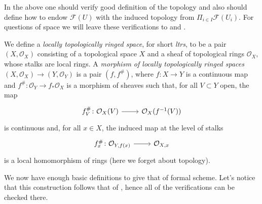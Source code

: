 \begin{rem}[]
	In the above one should verify good definition of the topology
	and also should define how to endow $\mathcal{F}(U)$
	with the induced topology from $\Pi_{i \in I} \mathcal{F}(U_i)$.
	For questions of space we will leave these verifications to
	\cite[\href{https://stacks.math.columbia.edu/tag/0AHY}{Section 0AHY}]{SP}
	and \cite[Chapter I, \S10]{EGA}.
\end{rem}


\begin{defn}
	We define a {\em locally topologically ringed space}, 
	for short {\em ltrs}, to be a pair
	$( X , \mathcal{O}_{ X } )$ consisting of a topological space $X$
	and a sheaf of topological rings $\mathcal{O}_X$,
	whose stalks are local rings.
	A {\em morphism of locally topologically ringed spaces}
	$( X , \mathcal{O}_{ X } ) \to  ( Y , \mathcal{O}_{ Y } )$
	is a pair $\left(f, f^\#\right)$,
	where $f\colon X \to Y$ is a continuous map
	and $f^\#\colon \mathcal{O}_Y \to f_* \mathcal{O}_X$ is
	a morphism of sheaves such that, for all $V \subset Y$ open,
	the map
	\begin{equation*}
	\begin{tikzcd}[row sep = 0ex
		,/tikz/column 1/.append style={anchor=base east}
		,/tikz/column 2/.append style={anchor=base west}]
		f^\#_V\colon \mathcal{O}_{ X }(V) \arrow[r, "", rightarrow] &
		\mathcal{O}_{ X }(f^{-1}(V))
	\end{tikzcd}
	\end{equation*} 
	is continuous and, for all $x \in X$, the induced map at the level
	of stalks
	\begin{equation*}
	\begin{tikzcd}[row sep = 0ex
		,/tikz/column 1/.append style={anchor=base east}
		,/tikz/column 2/.append style={anchor=base west}]
		f^\#_x\colon \mathcal{O}_{ Y,f(x) } \arrow[r, "", rightarrow] &
		\mathcal{O}_{ X,x }
	\end{tikzcd}
	\end{equation*} 
	is a local homomorphism of rings (here we forget about topology).
\end{defn}


\noindent
We now have enough basic definitions to give that of formal scheme.
Let's notice that this construction follows that of \cite[Chapter I, \S10]{EGA},
hence all of the verifications can be checked there.


